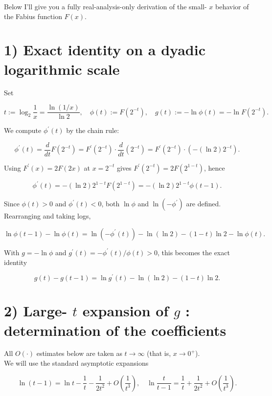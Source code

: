 \documentclass[10pt]{article}
\begin{document}
Below I'll give you a fully real-analysis-only derivation of the small- $x$ behavior of the Fabius function $F(x)$.

\section*{1) Exact identity on a dyadic logarithmic scale}
Set

$$
t:=\log _{2} \frac{1}{x}=\frac{\ln (1 / x)}{\ln 2}, \quad \phi(t):=F\left(2^{-t}\right), \quad g(t):=-\ln \phi(t)=-\ln F\left(2^{-t}\right) .
$$

We compute $\phi^{\prime}(t)$ by the chain rule:

$$
\phi^{\prime}(t)=\frac{d}{d t} F\left(2^{-t}\right)=F^{\prime}\left(2^{-t}\right) \cdot \frac{d}{d t}\left(2^{-t}\right)=F^{\prime}\left(2^{-t}\right) \cdot\left(-(\ln 2) 2^{-t}\right) .
$$

Using $F^{\prime}(x)=2 F(2 x)$ at $x=2^{-t}$ gives $F^{\prime}\left(2^{-t}\right)=2 F\left(2^{1-t}\right)$, hence

$$
\phi^{\prime}(t)=-(\ln 2) 2^{1-t} F\left(2^{1-t}\right)=-(\ln 2) 2^{1-t} \phi(t-1) .
$$

Since $\phi(t)>0$ and $\phi^{\prime}(t)<0$, both $\ln \phi$ and $\ln \left(-\phi^{\prime}\right)$ are defined. Rearranging and taking logs,

$$
\ln \phi(t-1)-\ln \phi(t)=\ln \left(-\phi^{\prime}(t)\right)-\ln (\ln 2)-(1-t) \ln 2-\ln \phi(t) .
$$

With $g=-\ln \phi$ and $g^{\prime}(t)=-\phi^{\prime}(t) / \phi(t)>0$, this becomes the exact identity


\begin{equation*}
g(t)-g(t-1)=\ln g^{\prime}(t)-\ln (\ln 2)-(1-t) \ln 2 . \tag{1}
\end{equation*}


\section*{2) Large- $t$ expansion of $g$ : determination of the coefficients}
All $O(\cdot)$ estimates below are taken as $t \rightarrow \infty$ (that is, $x \rightarrow 0^{+}$).\\
We will use the standard asymptotic expansions


\begin{equation*}
\ln (t-1)=\ln t-\frac{1}{t}-\frac{1}{2 t^{2}}+O\left(\frac{1}{t^{3}}\right), \quad \ln \frac{t}{t-1}=\frac{1}{t}+\frac{1}{2 t^{2}}+O\left(\frac{1}{t^{3}}\right) . \tag{2}
\end{equation*}
\end{document}
